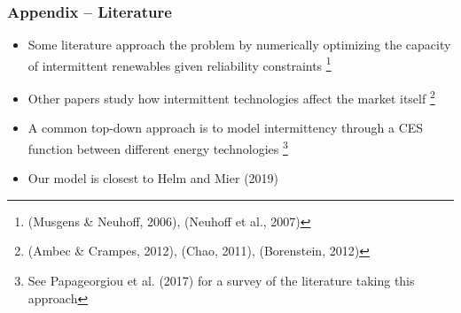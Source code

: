 \documentclass[aspectratio=169]{beamer}
\begin{document}
\begin{frame}
\frametitle{Appendix -- Literature}

\begin{itemize}
	\setlength\itemsep{0.2em}
	\item Some literature approach the problem by numerically optimizing the capacity of intermittent renewables given reliability constraints \footnote{(Musgens \& Neuhoff, 2006), (Neuhoff et al., 2007)}
	\item Other papers study how intermittent technologies affect the market itself \footnote{(Ambec \& Crampes, 2012), (Chao, 2011), (Borenstein, 2012)}	
	\item A common top-down approach is to model intermittency through a CES function between different energy technologies \footnote{See Papageorgiou et al. (2017) for a survey of the literature taking this approach}
	\item Our model is closest to Helm and Mier (2019)
\end{itemize}

\end{frame}
\end{document}
